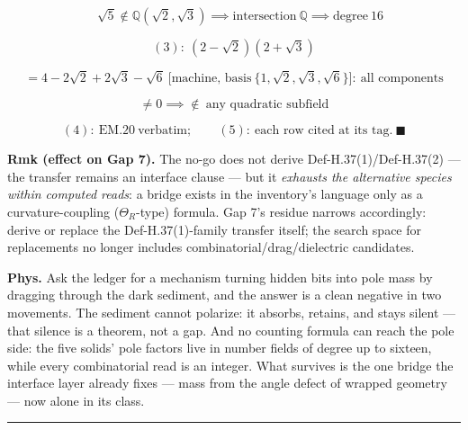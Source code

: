 \documentclass[11pt,openany]{report}
\theoremstyle{canonplain}
\theoremstyle{canondef}
\begin{document}
\[
\quad\sqrt5\notin\mathbb Q(\sqrt2,\sqrt3)\implies\text{intersection}\ \mathbb Q\implies\text{degree}\ 16
\]

\[
(3):\ (2{-}\sqrt2)(2{+}\sqrt3)
\]

\[
= 4{-}2\sqrt2{+}2\sqrt3{-}\sqrt6\ \text{[machine, basis}\ \{1,\sqrt2,\sqrt3,\sqrt6\}\text{]}:\ \text{all components}
\]

\[
\ne 0\implies\notin\ \text{any quadratic subfield}
\]

\[
(4):\ \mathrm{EM.20}\ \text{verbatim};\qquad(5):\ \text{each row cited at its tag}.\ \blacksquare
\]

\textbf{Rmk (effect on Gap 7).} The no-go does not derive Def-H.37(1)/Def-H.37(2) — the transfer remains an interface clause — but it \textit{exhausts the alternative species within computed reads}: a bridge exists in the inventory's language only as a curvature-coupling ($\Theta_R$-type) formula. Gap 7's residue narrows accordingly: derive or replace the Def-H.37(1)-family transfer itself; the search space for replacements no longer includes combinatorial/drag/dielectric candidates.

\textbf{Phys.} Ask the ledger for a mechanism turning hidden bits into pole mass by dragging through the dark sediment, and the answer is a clean negative in two movements. The sediment cannot polarize: it absorbs, retains, and stays silent — that silence is a theorem, not a gap. And no counting formula can reach the pole side: the five solids' pole factors live in number fields of degree up to sixteen, while every combinatorial read is an integer. What survives is the one bridge the interface layer already fixes — mass from the angle defect of wrapped geometry — now alone in its class.

\vspace{2pt}\noindent\rule{\textwidth}{0.4pt}\vspace{2pt}

\medskip
\end{document}
